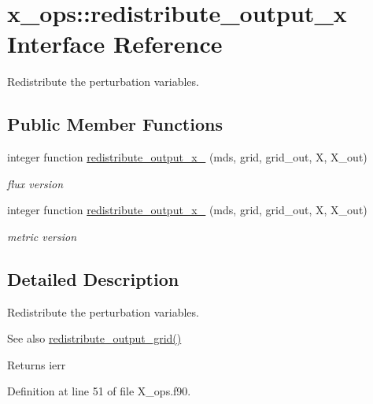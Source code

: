 \hypertarget{interfacex__ops_1_1redistribute__output__x}{}\section{x\+\_\+ops\+:\+:redistribute\+\_\+output\+\_\+x Interface Reference}
\label{interfacex__ops_1_1redistribute__output__x}


Redistribute the perturbation variables.  


\subsection*{Public Member Functions}
\begin{DoxyCompactItemize}
\item 
integer function \hyperlink{interfacex__ops_1_1redistribute__output__x_a6b0786ecc5e4369dfa167217eb920f9b}{redistribute\+\_\+output\+\_\+x\+\_} (mds, grid, grid\+\_\+out, X, X\+\_\+out)
\begin{DoxyCompactList}\small\item\em flux version \end{DoxyCompactList}\item 
integer function \hyperlink{interfacex__ops_1_1redistribute__output__x_a23332572b6281c2e438325875216d863}{redistribute\+\_\+output\+\_\+x\+\_} (mds, grid, grid\+\_\+out, X, X\+\_\+out)
\begin{DoxyCompactList}\small\item\em metric version \end{DoxyCompactList}\end{DoxyCompactItemize}


\subsection{Detailed Description}
Redistribute the perturbation variables. 

\begin{DoxySeeAlso}{See also}
\hyperlink{namespacegrid__ops_ab10ef5b486ee3861df2da4e53bc22630}{redistribute\+\_\+output\+\_\+grid()}
\end{DoxySeeAlso}
\begin{DoxyReturn}{Returns}
ierr 
\end{DoxyReturn}


Definition at line 51 of file X\+\_\+ops.\+f90.



